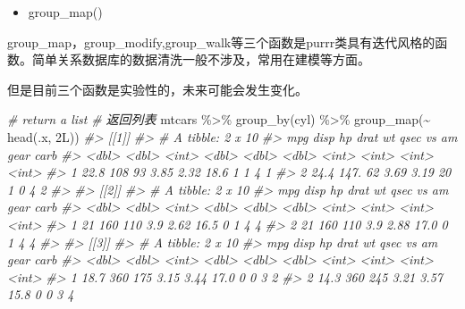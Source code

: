 \documentclass[
]{book}
\newenvironment{Shaded}{\begin{snugshade}}{\end{snugshade}}
\newcommand{\CommentTok}[1]{\textcolor[rgb]{0.56,0.35,0.01}{\textit{#1}}}
\newcommand{\FunctionTok}[1]{\textcolor[rgb]{0.00,0.00,0.00}{#1}}
\newcommand{\NormalTok}[1]{#1}
\newcommand{\SpecialCharTok}[1]{\textcolor[rgb]{0.00,0.00,0.00}{#1}}
\providecommand{\tightlist}{%
  \setlength{\itemsep}{0pt}\setlength{\parskip}{0pt}}
\begin{document}
\begin{itemize}
\tightlist
\item
  group\_map()
\end{itemize}

group\_map，group\_modify,group\_walk等三个函数是purrr类具有迭代风格的函数。简单关系数据库的数据清洗一般不涉及，常用在建模等方面。

但是目前三个函数是实验性的，未来可能会发生变化。

\begin{Shaded}
\begin{Highlighting}[]
\CommentTok{\# return a list}
\CommentTok{\# 返回列表}
\NormalTok{mtcars }\SpecialCharTok{\%\textgreater{}\%}
  \FunctionTok{group\_by}\NormalTok{(cyl) }\SpecialCharTok{\%\textgreater{}\%}
  \FunctionTok{group\_map}\NormalTok{(}\SpecialCharTok{\textasciitilde{}} \FunctionTok{head}\NormalTok{(.x, 2L))}
\CommentTok{\#\textgreater{} [[1]]}
\CommentTok{\#\textgreater{} \# A tibble: 2 x 10}
\CommentTok{\#\textgreater{}     mpg  disp    hp  drat    wt  qsec    vs    am  gear  carb}
\CommentTok{\#\textgreater{}   \textless{}dbl\textgreater{} \textless{}dbl\textgreater{} \textless{}int\textgreater{} \textless{}dbl\textgreater{} \textless{}dbl\textgreater{} \textless{}dbl\textgreater{} \textless{}int\textgreater{} \textless{}int\textgreater{} \textless{}int\textgreater{} \textless{}int\textgreater{}}
\CommentTok{\#\textgreater{} 1  22.8  108     93  3.85  2.32  18.6     1     1     4     1}
\CommentTok{\#\textgreater{} 2  24.4  147.    62  3.69  3.19  20       1     0     4     2}
\CommentTok{\#\textgreater{} }
\CommentTok{\#\textgreater{} [[2]]}
\CommentTok{\#\textgreater{} \# A tibble: 2 x 10}
\CommentTok{\#\textgreater{}     mpg  disp    hp  drat    wt  qsec    vs    am  gear  carb}
\CommentTok{\#\textgreater{}   \textless{}dbl\textgreater{} \textless{}dbl\textgreater{} \textless{}int\textgreater{} \textless{}dbl\textgreater{} \textless{}dbl\textgreater{} \textless{}dbl\textgreater{} \textless{}int\textgreater{} \textless{}int\textgreater{} \textless{}int\textgreater{} \textless{}int\textgreater{}}
\CommentTok{\#\textgreater{} 1    21   160   110   3.9  2.62  16.5     0     1     4     4}
\CommentTok{\#\textgreater{} 2    21   160   110   3.9  2.88  17.0     0     1     4     4}
\CommentTok{\#\textgreater{} }
\CommentTok{\#\textgreater{} [[3]]}
\CommentTok{\#\textgreater{} \# A tibble: 2 x 10}
\CommentTok{\#\textgreater{}     mpg  disp    hp  drat    wt  qsec    vs    am  gear  carb}
\CommentTok{\#\textgreater{}   \textless{}dbl\textgreater{} \textless{}dbl\textgreater{} \textless{}int\textgreater{} \textless{}dbl\textgreater{} \textless{}dbl\textgreater{} \textless{}dbl\textgreater{} \textless{}int\textgreater{} \textless{}int\textgreater{} \textless{}int\textgreater{} \textless{}int\textgreater{}}
\CommentTok{\#\textgreater{} 1  18.7   360   175  3.15  3.44  17.0     0     0     3     2}
\CommentTok{\#\textgreater{} 2  14.3   360   245  3.21  3.57  15.8     0     0     3     4}
\end{Highlighting}
\end{Shaded}
\end{document}
